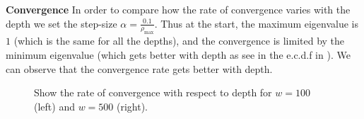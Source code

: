 \textbf{Convergence} In order to compare how the rate of convergence varies with the depth we set the step-size $\alpha=\frac{0.1}{\rho_{\max}}$. Thus at the start, the maximum eigenvalue is $1$ (which is the same for all the depths), and the convergence is limited by the minimum eigenvalue (which gets better with depth as see in the e.c.d.f in ). We can observe that the convergence rate gets better with depth.
\begin{figure}[h]
\caption{Show the rate of convergence with respect to depth for $w=100$ (left) and $w=500$ (right).}
\end{figure}

